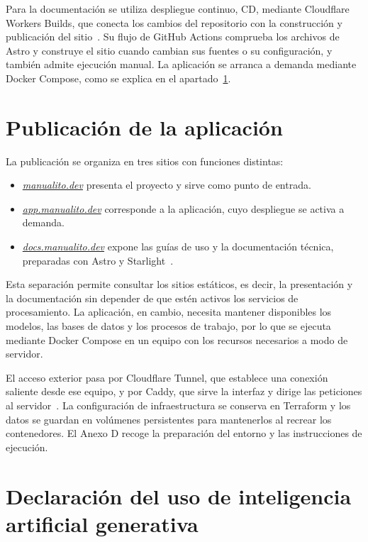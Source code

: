 Para la documentación se utiliza despliegue continuo, \acs{CD}, mediante
Cloudflare Workers Builds, que conecta los cambios del repositorio con la
construcción y publicación del sitio~\cite{cloudflare_workers_builds}.
 Su flujo de GitHub Actions comprueba los archivos de Astro y
construye el sitio cuando cambian sus fuentes o su configuración, y también
admite ejecución manual. La aplicación se arranca a demanda mediante
Docker Compose, como se explica en el apartado~\ref{aspectos:publicacion}.

\section{Publicación de la aplicación}
\label{aspectos:publicacion}

La publicación se organiza en tres sitios con funciones distintas:

\begin{itemize}
    \item \href{https://manualito.dev/}{\textit{manualito.dev}} presenta el
    proyecto y sirve como punto de entrada.
    \item \href{https://app.manualito.dev/}{\textit{app.manualito.dev}}
    corresponde a la aplicación, cuyo despliegue se activa a demanda.
    \item \href{https://docs.manualito.dev/}{\textit{docs.manualito.dev}}
    expone las guías de uso y la documentación técnica, preparadas con
    Astro y Starlight~\cite{astro_documentation,starlight_documentation}.
\end{itemize}

Esta separación permite consultar los sitios estáticos, es decir, la presentación y la documentación sin
depender de que estén activos los servicios de procesamiento. La
aplicación, en cambio, necesita mantener disponibles los modelos, las
bases de datos y los procesos de trabajo, por lo que se ejecuta mediante
Docker Compose en un equipo con los recursos necesarios a modo de servidor.

El acceso exterior pasa por Cloudflare Tunnel, que establece una conexión
saliente desde ese equipo, y por Caddy, que sirve la interfaz y dirige las
peticiones al servidor~\cite{cloudflare_tunnel}. La configuración de
infraestructura se conserva en Terraform y los datos se guardan en
volúmenes persistentes para mantenerlos al recrear los contenedores. El
Anexo D recoge la preparación del entorno y las instrucciones de ejecución.

\section{Declaración del uso de inteligencia artificial generativa}
\label{aspectos:uso-ia}

